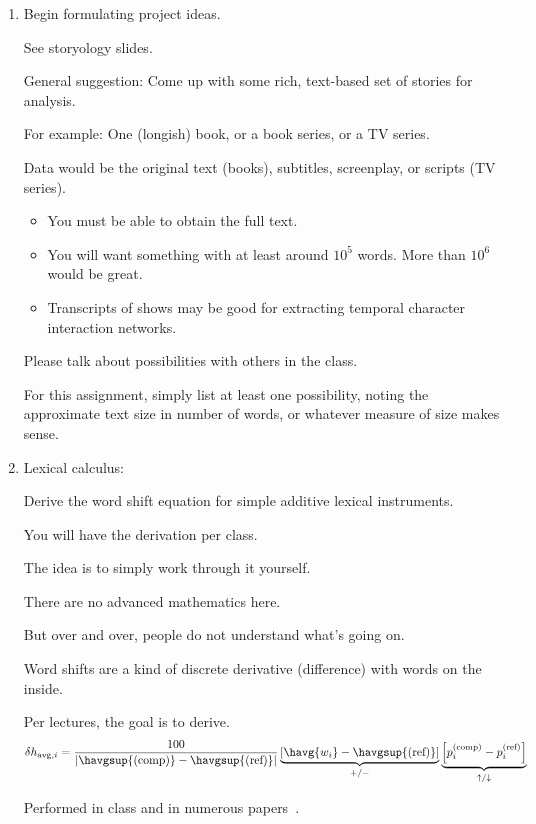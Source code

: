 \begin{enumerate}
  
\item

  Begin formulating project ideas.

  See storyology slides.
  
  General suggestion: Come up with some rich, text-based set of stories for analysis.

  For example: One (longish) book, or a book series, or a TV series.

  Data would be the original text (books), subtitles, screenplay, or scripts (TV series).

  \begin{itemize}
  \item 
    You must be able to obtain the full text.
  \item 
    You will want something with at least around $10^{5}$ words.
    More than $10^{6}$ would be great.
  \item 
    Transcripts of shows may be good for extracting
    temporal character interaction networks.
  \end{itemize}
  
  Please talk about possibilities with others in the class.
  
  For this assignment, simply list at least one possibility, noting the approximate text size
  in number of words, or whatever measure of size makes sense.

  
   \solutionstart


   \solutionend

\item

  Lexical calculus:

  Derive the word shift equation for simple additive lexical instruments.

  You will have the derivation per class.

  The idea is to simply work through it yourself.

  There are no advanced mathematics here.

  But over and over, people do not understand what's going on.

  Word shifts are a kind of discrete derivative (difference) with words on the inside.

  Per lectures, the goal is to derive.
  $$
  \delta h_{\textnormal{avg},i}
  =
  \frac{100}{
    \left|
    \havgsup{(\rm comp)} - \havgsup{(\textnormal{ref})}
    \right|
  }
  \underbrace{
    \left[
      \havg{w_{i}} - \havgsup{(\textnormal{ref})}
      \right]
  }_{+/-}
  \underbrace{
    \left[
      p_{i}^{(\textnormal{comp})} - p_{i}^{(\textnormal{ref})}
      \right]
  }_{\uparrow/\downarrow}
  $$

  Performed in class and in numerous papers~\cite{dodds2009c,dodds2011e,dodds2015a}.

  
   \solutionstart


   \solutionend

\end{enumerate}
